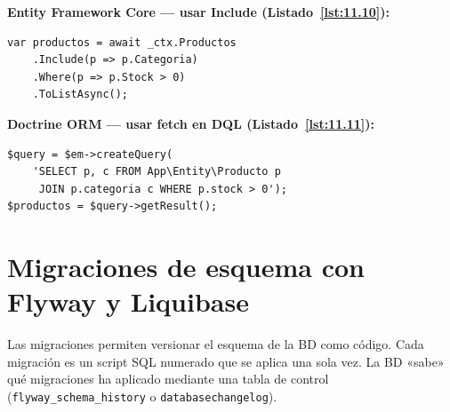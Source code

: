 \textbf{Entity Framework Core --- usar Include (Listado~\ref{lst:11.10}):}
\begin{lstlisting}[style=cs,numbers=none,caption={Ejemplo de C\#},label=lst:11.10]
var productos = await _ctx.Productos
    .Include(p => p.Categoria)
    .Where(p => p.Stock > 0)
    .ToListAsync();
\end{lstlisting}

\textbf{Doctrine ORM --- usar fetch en DQL (Listado~\ref{lst:11.11}):}
\begin{lstlisting}[style=php,numbers=none,caption={Ejemplo de PHP},label=lst:11.11]
$query = $em->createQuery(
    'SELECT p, c FROM App\Entity\Producto p
     JOIN p.categoria c WHERE p.stock > 0');
$productos = $query->getResult();
\end{lstlisting}

\section{Migraciones de esquema con Flyway y Liquibase}

Las migraciones permiten versionar el esquema de la BD como código.
Cada migración es un script SQL numerado que se aplica una sola vez.
La BD «sabe» qué migraciones ha aplicado mediante una tabla de control
(\texttt{flyway\_schema\_history} o \texttt{databasechangelog}).

